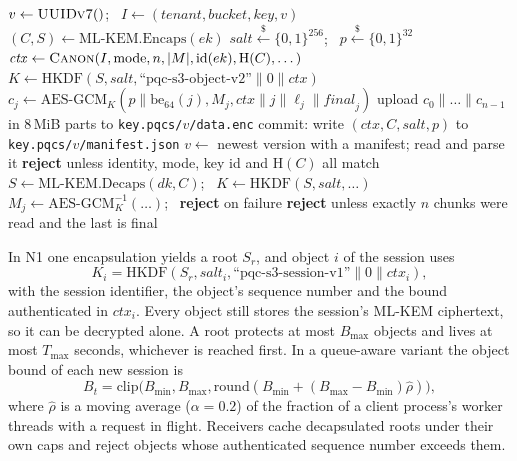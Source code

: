 \documentclass[review,12pt]{elsarticle}
\begin{document}
\begin{algorithm}[!htbp]
\caption{Per-object PUT and GET (mode P1)}
\label{alg:putget}
\footnotesize
\begin{algorithmic}[1]
\State $v \gets \textsc{UUIDv7}()$; \ $I \gets (\mathit{tenant},\mathit{bucket},\mathit{key},v)$
\State $(C,S) \gets \mathrm{ML\mbox{-}KEM.Encaps}(ek)$
\State $\mathit{salt} \xleftarrow{\$} \{0,1\}^{256}$; \ $p \xleftarrow{\$} \{0,1\}^{32}$
\State $\mathit{ctx} \gets \textsc{Canon}(I,\text{mode},n,|M|,\mathrm{id}(ek),\mathrm{H}(C),\dots)$
\State $K \gets \mathrm{HKDF}(S,\mathit{salt},\text{``pqc-s3-object-v2''}\|0\|\mathit{ctx})$
 
\State $c_j \gets \mathrm{AES\mbox{-}GCM}_K(p\|\mathrm{be}_{64}(j), M_j, \mathit{ctx}\|j\|\ell_j\|\mathit{final}_j)$
\EndFor
\State upload $c_0\|\dots\|c_{n-1}$ in 8\,MiB parts to \texttt{key.pqcs/$v$/data.enc}
\State commit: write $(\mathit{ctx},C,\mathit{salt},p)$ to \texttt{key.pqcs/$v$/manifest.json}
\EndProcedure
{}
\State $v \gets$ newest version with a manifest; read and parse it
\State \textbf{reject} unless identity, mode, key id and $\mathrm{H}(C)$ all match
\State $S \gets \mathrm{ML\mbox{-}KEM.Decaps}(dk,C)$; \ $K \gets \mathrm{HKDF}(S,\mathit{salt},\dots)$
\State $M_j \gets \mathrm{AES\mbox{-}GCM}^{-1}_K(\dots)$; \ \textbf{reject} on failure
\EndFor
\State \textbf{reject} unless exactly $n$ chunks were read and the last is final
\EndProcedure
\end{algorithmic}
\end{algorithm}

In N1 one encapsulation yields a root $S_r$, and object $i$ of the session uses
\[K_i=\mathrm{HKDF}(S_r,\mathit{salt}_i,\text{``pqc-s3-session-v1''}\|0\|\mathit{ctx}_i),\]
with the session identifier, the object's sequence number and the bound authenticated in
$\mathit{ctx}_i$. Every object still stores the session's ML-KEM ciphertext, so it can be
decrypted alone. A root protects at most $B_{\max}$ objects and lives at most $T_{\max}$ seconds,
whichever is reached first. In a queue-aware variant the object bound of each new session is
\[B_t=\mathrm{clip}\bigl(B_{\min},B_{\max},\mathrm{round}(B_{\min}+(B_{\max}-B_{\min})\hat\rho)\bigr),\]
where $\hat\rho$ is a moving average ($\alpha=0.2$) of the fraction of a client process's worker
threads with a request in flight. Receivers cache decapsulated roots under their own caps and
reject objects whose authenticated sequence number exceeds them.
\end{document}
